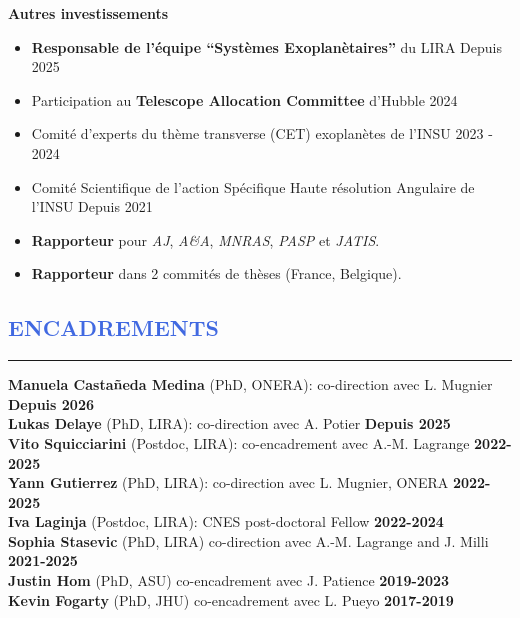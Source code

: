 \documentclass[11pt, a4paper, french]{article}
\begin{document}
\vspace{0.1cm}
\textbf{Autres investissements}
\vspace{-0.1cm}
\begin{itemize} \itemsep -2pt
    \item[$\bullet$] \textbf{Responsable de l'équipe ``Systèmes Exoplanètaires''} du LIRA \hfill Depuis 2025
    \item[$\bullet$] Participation au \textbf{Telescope Allocation Committee} d'Hubble \hfill 2024
    \item[$\bullet$] Comité d'experts du thème transverse (CET) exoplanètes de l'INSU  \hfill 2023 - 2024
    \item[$\bullet$] Comité Scientifique de l'action Spécifique Haute résolution Angulaire de l'INSU \hfill Depuis 2021
    \item[$\bullet$] \textbf{Rapporteur} pour \textit{AJ}, \textit{A\&A}, \textit{MNRAS}, \textit{PASP} et \textit{JATIS}.
    \item[$\bullet$] \textbf{Rapporteur} dans 2 commités de thèses (France, Belgique).
\end{itemize}




\vspace{-0.8cm}
\textcolor{RoyalBlue}{\section{\large ENCADREMENTS}
\vspace{-0.2cm}\hrule}
\vspace{0.25cm}
\textbf{Manuela Castañeda Medina} (PhD, ONERA): co-direction avec L. Mugnier \hfill \textbf{Depuis 2026}\\
\textbf{Lukas Delaye} (PhD, LIRA): co-direction avec A. Potier \hfill \textbf{Depuis 2025}\\
\textbf{Vito Squicciarini} (Postdoc, LIRA): co-encadrement avec A.-M. Lagrange \hfill \textbf{2022-2025}\\
\textbf{Yann Gutierrez} (PhD, LIRA): co-direction avec L. Mugnier, ONERA \hfill \textbf{2022-2025}\\
\textbf{Iva Laginja} (Postdoc, LIRA): CNES post-doctoral Fellow \hfill \textbf{2022-2024}\\
\textbf{Sophia Stasevic} (PhD, LIRA) co-direction avec A.-M. Lagrange and J. Milli \hfill \textbf{2021-2025}\\
\textbf{Justin Hom} (PhD, ASU) co-encadrement avec J. Patience \hfill \textbf{2019-2023}\\
\textbf{Kevin Fogarty} (PhD, JHU) co-encadrement avec L. Pueyo \hfill \textbf{2017-2019}\\
\end{document}
